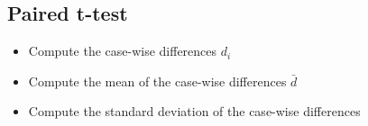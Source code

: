 
\subsection{Paired t-test}
\begin{frame}
\begin{itemize}
\item Compute the case-wise differences $d_i$
\item Compute the mean of the case-wise differences $\bar{d}$
\item Compute the standard deviation of the case-wise differences
\end{itemize}
\end{frame}
